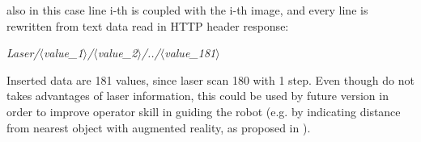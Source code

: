 also in this case line i-th is coupled with the i-th image, and
every line is rewritten from text data read in HTTP header
response:

\begin{center}
  \textit{Laser/$\langle$value\_1$\rangle$/$\langle$value\_2$\rangle$/../$\langle$value\_181$\rangle$}
\end{center}

Inserted data are 181 values, since laser scan 180 \textdegree
with 1 \textdegree step. Even though \framework{} do not takes
advantages of laser information, this could be used by future
version in order to improve operator skill in guiding the robot
(e.g. by indicating distance from nearest object with augmented
reality, as proposed in \cite{morduc:macalusodetommaso}).
